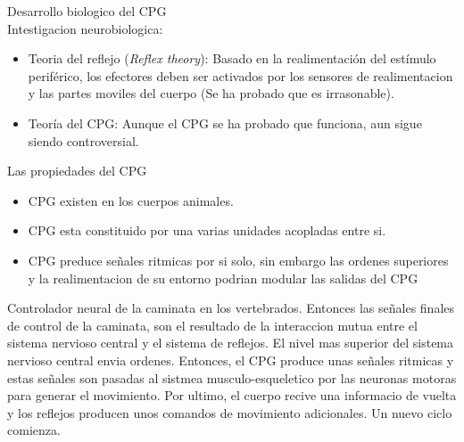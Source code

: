 \documentclass[10pt,onecolumn,twoside,letterpaper]{article}
\begin{document}
Desarrollo biologico del CPG\\
Intestigacion neurobiologica:
\begin{itemize}
\item Teoria del reflejo (\emph{Reflex theory}): Basado en la realimentaci\'on del est\'imulo perif\'erico, los efectores deben ser activados por los sensores de realimentacion y las partes moviles del cuerpo (Se ha probado que es irrasonable).
\item Teor\'ia del CPG: Aunque el CPG se ha probado que funciona, aun sigue siendo controversial.
\end{itemize}
Las propiedades del CPG\\
\begin{itemize}
\item CPG existen en los cuerpos animales.
\item CPG esta constituido por una varias unidades acopladas entre si.
\item CPG preduce se\~nales ritmicas por si solo, sin embargo las ordenes superiores y la realimentacion de su entorno podrian modular las salidas del CPG
\end{itemize}
Controlador neural de la caminata en los vertebrados. Entonces las se\~nales finales de control de la caminata, son el resultado de la interaccion mutua entre el sistema nervioso central y el sistema de reflejos. El nivel mas superior del sistema nervioso central envia ordenes. Entonces, el CPG produce unas se\~nales ritmicas y estas se\~nales son pasadas al sistmea musculo-esqueletico por las neuronas motoras para generar el movimiento. Por ultimo, el cuerpo recive una informacio de vuelta y los reflejos producen unos comandos de movimiento adicionales. Un nuevo ciclo comienza.\\
\end{document}
